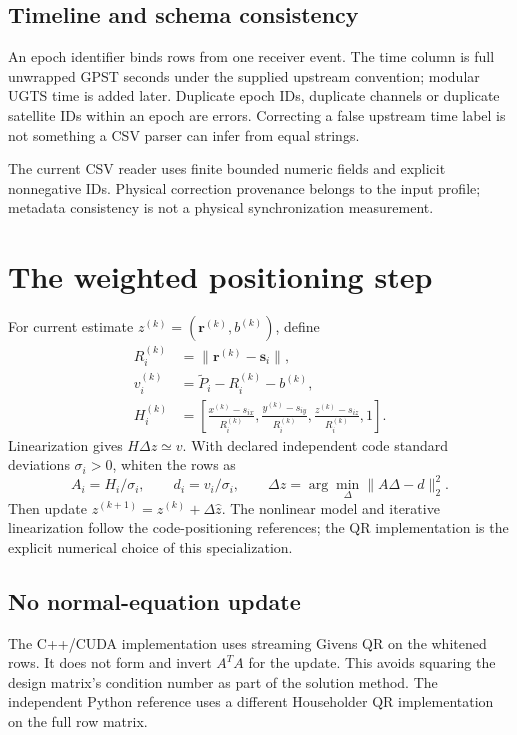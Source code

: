 \subsection{Timeline and schema consistency}
An epoch identifier binds rows from one receiver event. The time column is full
unwrapped GPST seconds under the supplied upstream convention; modular UGTS time is
added later. Duplicate epoch IDs, duplicate channels or duplicate satellite IDs within
an epoch are errors. Correcting a false upstream time label is not something a CSV
parser can infer from equal strings.

The current CSV reader uses finite bounded numeric fields and explicit nonnegative
IDs. Physical correction provenance belongs to the input profile; metadata consistency
is not a physical synchronization measurement.
\clearpage

\section{The weighted positioning step}
For current estimate $z^{(k)}=(\boldsymbol r^{(k)},b^{(k)})$, define
\begin{align}
R_i^{(k)}&=\|\boldsymbol r^{(k)}-\boldsymbol s_i\|,\\
v_i^{(k)}&=\widetilde P_i-R_i^{(k)}-b^{(k)},\\
H_i^{(k)}&=\left[\frac{x^{(k)}-s_{ix}}{R_i^{(k)}},
\frac{y^{(k)}-s_{iy}}{R_i^{(k)}},
\frac{z^{(k)}-s_{iz}}{R_i^{(k)}},1\right].
\end{align}
Linearization gives $H\Delta z\simeq v$. With declared independent code standard
deviations $\sigma_i>0$, whiten the rows as
\begin{equation}
A_i=H_i/\sigma_i,\qquad d_i=v_i/\sigma_i,
\qquad\Delta\widehat z=\arg\min_\Delta\|A\Delta-d\|_2^2.
\end{equation}
Then update $z^{(k+1)}=z^{(k)}+\Delta\widehat z$. The nonlinear model and iterative
linearization follow the code-positioning references; the QR implementation is the
explicit numerical choice of this specialization. 

\subsection{No normal-equation update}
The C++/CUDA implementation uses streaming Givens QR on the whitened rows. It does
not form and invert $A^TA$ for the update. This avoids squaring the design matrix's
condition number as part of the solution method. The independent Python reference
uses a different Householder QR implementation on the full row matrix.

